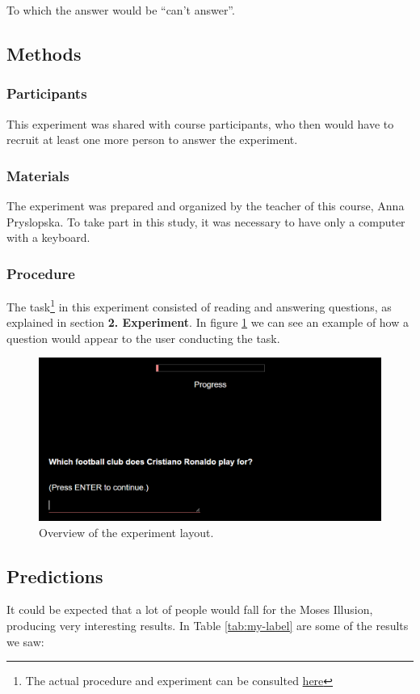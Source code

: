\documentclass{article}
\begin{document}
To which the answer would be \enquote{can't answer}.

\subsection{Methods}
\subsubsection{Participants}
This experiment was shared with course participants, who then would have to recruit at least one more person to answer the experiment.
\subsubsection{Materials}
The experiment was prepared and organized by the teacher of this course, Anna Pryslopska. To take part in this study, it was necessary to have only a computer with a keyboard.

\subsubsection{Procedure}
The task\footnote{The actual procedure and experiment can be consulted \href{https://farm.pcibex.net/p/glQRwV/}{here}} in this experiment consisted of reading and answering questions, as explained in section \textbf{2. Experiment}. In figure \ref{fig:enter-label} we can see an example of how a question would appear to the user conducting the task.

\begin{figure}
    \centering
    \includegraphics[width=1\linewidth]{mosesfigure.png}
    \caption{Overview of the experiment layout.}
    \label{fig:enter-label}
\end{figure}


\subsection{Predictions}
It could be expected that a lot of people would fall for the Moses Illusion, producing very interesting results.
In Table \ref{tab:my-label} are some of the results we saw:
\end{document}
